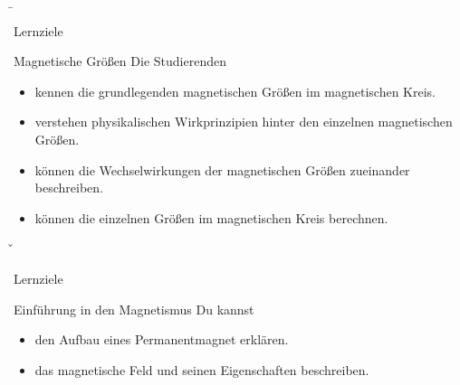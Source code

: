 \b{
	\begin{frame}{Lernziele}
		\begin{Lernziele}{Magnetische Größen}
			Die Studierenden
			\begin{itemize}
				\item kennen die grundlegenden magnetischen Größen im magnetischen Kreis.
				\item verstehen physikalischen Wirkprinzipien hinter den einzelnen magnetischen Größen.
				\item können die Wechselwirkungen der magnetischen Größen zueinander beschreiben.
				\item können die einzelnen Größen im magnetischen Kreis berechnen.
			\end{itemize}
		\end{Lernziele}
	\end{frame}
}
\v{
	\begin{frame}{Lernziele}
		\begin{Lernziele}{Einführung in den Magnetismus}
			Du kannst
			\begin{itemize}
				\item den Aufbau eines Permanentmagnet erklären.
				\item das magnetische Feld und seinen Eigenschaften beschreiben.
			\end{itemize}
		\end{Lernziele}
	\end{frame}
}

